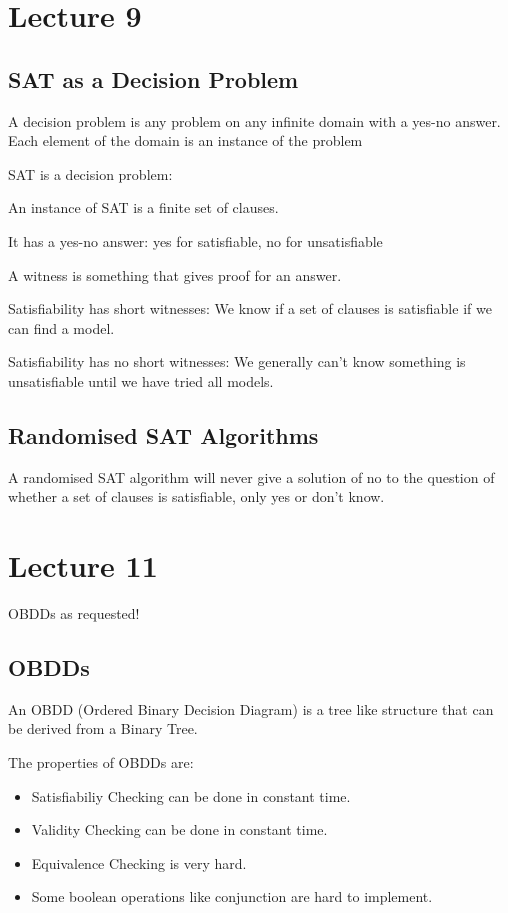 \documentclass[11pt,a4paper]{article}
\begin{document}
\section{Lecture 9}

\subsection{SAT as a Decision Problem}

A decision problem is any problem on any infinite domain with a yes-no answer. Each element of the domain is an instance of the problem

SAT is a decision problem:

An instance of SAT is a finite set of clauses.

It has a yes-no answer: yes for satisfiable, no for unsatisfiable

A witness is something that gives proof for an answer.

Satisfiability has short witnesses: We know if a set of clauses is satisfiable if we can find a model.

Satisfiability has no short witnesses: We generally can't know something is unsatisfiable until we have tried all models.

\subsection{Randomised SAT Algorithms}

A randomised SAT algorithm will never give a solution of no to the question of whether a set of clauses is satisfiable, only yes or don't know.

\section{Lecture 11}

OBDDs as requested!

\subsection{OBDDs}

An OBDD (Ordered Binary Decision Diagram) is a tree like structure that can be derived from a Binary Tree.

The properties of OBDDs are:
\begin{itemize}
\item Satisfiabiliy Checking can be done in constant time.
\item Validity Checking can be done in constant time.
\item Equivalence Checking is very hard.
\item Some boolean operations like conjunction are hard to implement.
\end{itemize}
\end{document}
